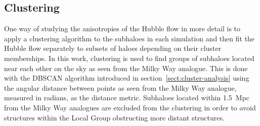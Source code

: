 \documentclass[english, oneside]{HYgradu}
\begin{document}


\subsection{Clustering} \label{sect:clustering}
One way of studying the anisotropies of the Hubble flow in more detail is to apply a clustering algorithm to the subhaloes in each simulation and then fit the Hubble flow separately to subsets of haloes depending on their cluster memberships. In this work, clustering is used to find groups of subhaloes located near each other on the sky as seen from the Milky Way analogue. This is done with the DBSCAN algorithm introduced in section~\ref{sect:cluster-analysis} using the angular distance between points as seen from the Milky Way analogue, measured in radians, as the distance metric. Subhaloes located within 1.5~Mpc from the Milky Way analogues are excluded from the clustering in order to avoid structures within the Local Group obstructing more distant structures.
\end{document}
